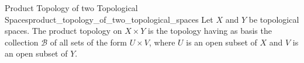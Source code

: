 \begin{definition}
{Product Topology of two Topological Spaces}{product_topology_of_two_topological_spaces}
Let \(X\) and \(Y\) be topological spaces. The product topology on \(X \times
Y\) is the topology having as basis the collection \(\mathcal{B}\) of all sets
of the form \(U \times V\), where \(U\) is an open subset of \(X\) and \(V\) is
an open subset of \(Y\).
\end{definition}
